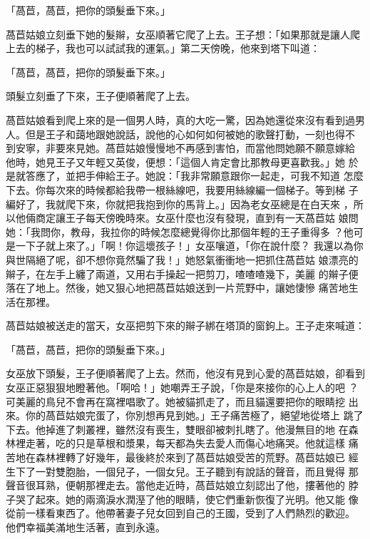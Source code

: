 \documentclass[oneside,11pt]{memoir} %
\begin{document}
「萵苣，萵苣，把你的頭髮垂下來。」

萵苣姑娘立刻垂下她的髮辮，女巫順著它爬了上去。王子想：「如果那就是讓人爬
上去的梯子，我也可以試試我的運氣。」第二天傍晚，他來到塔下叫道：

「萵苣，萵苣，把你的頭髮垂下來。」

頭髮立刻垂了下來，王子便順著爬了上去。

萵苣姑娘看到爬上來的是一個男人時，真的大吃一驚，因為她還從來沒有看到過男
人。但是王子和藹地跟她說話，說他的心如何如何被她的歌聲打動，一刻也得不
到安寧，非要來見她。萵苣姑娘慢慢地不再感到害怕，而當他問她願不願意嫁給
他時，她見王子又年輕又英俊，便想：「這個人肯定會比那教母更喜歡我。」她
於是就答應了，並把手伸給王子。她說：「我非常願意跟你一起走，可我不知道
怎麼下去。你每次來的時候都給我帶一根絲線吧，我要用絲線編一個梯子。等到梯
子編好了，我就爬下來，你就把我抱到你的馬背上。」因為老女巫總是在白天來
，所以他倆商定讓王子每天傍晚時來。女巫什麼也沒有發現，直到有一天萵苣姑
娘問她：「我問你，教母，我拉你的時候怎麼總覺得你比那個年輕的王子重得多
？他可是一下子就上來了。」「啊！你這壞孩子！」女巫嚷道，「你在說什麼？
我還以為你與世隔絕了呢，卻不想你竟然騙了我！」她怒氣衝衝地一把抓住萵苣姑
娘漂亮的辮子，在左手上纏了兩道，又用右手操起一把剪刀，喳喳喳幾下，美麗
的辮子便落在了地上。然後，她又狠心地把萵苣姑娘送到一片荒野中，讓她悽慘
痛苦地生活在那裡。

萵苣姑娘被送走的當天，女巫把剪下來的辮子綁在塔頂的窗鉤上。王子走來喊道：

「萵苣，萵苣，把你的頭髮垂下來。」

女巫放下頭髮，王子便順著爬了上去。然而，他沒有見到心愛的萵苣姑娘，卻看到
女巫正惡狠狠地瞪著他。「啊哈！」她嘲弄王子說，「你是來接你的心上人的吧
？可美麗的鳥兒不會再在窩裡唱歌了。她被貓抓走了，而且貓還要把你的眼睛挖
出來。你的萵苣姑娘完蛋了，你別想再見到她。」王子痛苦極了，絕望地從塔上
跳了下去。他掉進了刺叢裡，雖然沒有喪生，雙眼卻被刺扎瞎了。他漫無目的地
在森林裡走著，吃的只是草根和漿果，每天都為失去愛人而傷心地痛哭。他就這樣
痛苦地在森林裡轉了好幾年，最後終於來到了萵苣姑娘受苦的荒野。萵苣姑娘已
經生下了一對雙胞胎，一個兒子，一個女兒。王子聽到有說話的聲音，而且覺得
那聲音很耳熟，便朝那裡走去。當他走近時，萵苣姑娘立刻認出了他，摟著他的
脖子哭了起來。她的兩滴淚水潤溼了他的眼睛，使它們重新恢復了光明。他又能
像從前一樣看東西了。他帶著妻子兒女回到自己的王國，受到了人們熱烈的歡迎。
他們幸福美滿地生活著，直到永遠。

\end{document}
